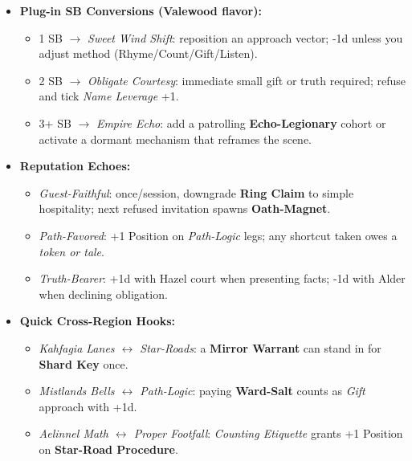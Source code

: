 \begin{itemize}
  \item \textbf{Plug-in SB Conversions (Valewood flavor):}
  \begin{itemize}
    \item 1 SB \(\rightarrow\) \emph{Sweet Wind Shift}: reposition an approach vector; -1d unless you adjust method (Rhyme/Count/Gift/Listen).
    \item 2 SB \(\rightarrow\) \emph{Obligate Courtesy}: immediate small gift or truth required; refuse and tick \emph{Name Leverage} +1.
    \item 3+ SB \(\rightarrow\) \emph{Empire Echo}: add a patrolling \textbf{Echo-Legionary} cohort or activate a dormant mechanism that reframes the scene.
  \end{itemize}

  \item \textbf{Reputation Echoes:}
  \begin{itemize}
    \item \emph{Guest-Faithful}: once/session, downgrade \textbf{Ring Claim} to simple hospitality; next refused invitation spawns \textbf{Oath-Magnet}.
    \item \emph{Path-Favored}: +1 Position on \emph{Path-Logic} legs; any shortcut taken owes a \emph{token or tale}.
    \item \emph{Truth-Bearer}: +1d with Hazel court when presenting facts; -1d with Alder when declining obligation.
  \end{itemize}

  \item \textbf{Quick Cross-Region Hooks:}
  \begin{itemize}
    \item \emph{Kahfagia Lanes \(\leftrightarrow\) Star-Roads}: a \textbf{Mirror Warrant} can stand in for \textbf{Shard Key} once.
    \item \emph{Mistlands Bells \(\leftrightarrow\) Path-Logic}: paying \textbf{Ward-Salt} counts as \emph{Gift} approach with +1d.
    \item \emph{Aelinnel Math \(\leftrightarrow\) Proper Footfall}: \emph{Counting Etiquette} grants +1 Position on \textbf{Star-Road Procedure}.
  \end{itemize}
\end{itemize}